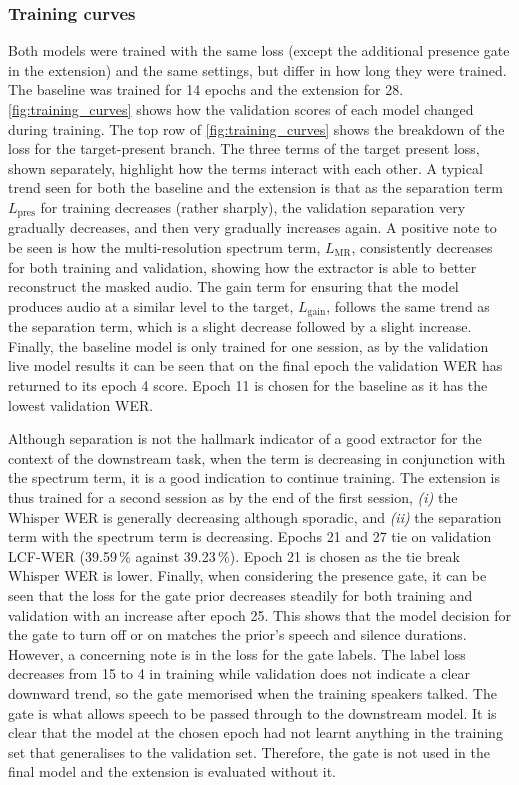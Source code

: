   \subsubsection{Training curves}
  \label{exp:curves}
  Both models were trained with the same loss (except the additional presence gate in the extension) and the same settings, but differ in how long they were trained. The baseline was trained for 14 epochs and the extension for 28. \autoref{fig:training_curves} shows how the validation scores of each model changed during training. The top row of \autoref{fig:training_curves} shows the breakdown of the loss for the target-present branch. The three terms of the target present loss, shown separately, highlight how the terms interact with each other. A typical trend seen for both the baseline and the extension is that as the separation term $L_{\text{pres}}$ for training decreases (rather sharply), the validation separation very gradually decreases, and then very gradually increases again. A positive note to be seen is how the multi-resolution spectrum term, $L_{\text{MR}}$, consistently decreases for both training and validation, showing how the extractor is able to better reconstruct the masked audio. The gain term for ensuring that the model produces audio at a similar level to the target, $L_{\text{gain}}$, follows the same trend as the separation term, which is a slight decrease followed by a slight increase. Finally, the baseline model is only trained for one session, as by the validation live model results it can be seen that on the final epoch the validation WER has returned to its epoch 4 score. Epoch 11 is chosen for the baseline as it has the lowest validation WER. 
    
  Although separation is not the hallmark indicator of a good extractor for the context of the downstream task, when the term is decreasing in conjunction with the spectrum term, it is a good indication to continue training. The extension is thus trained for a second session as by the end of the first session, \textit{(i)} the Whisper WER is generally decreasing although sporadic, and \textit{(ii)} the separation term with the spectrum term is decreasing. Epochs 21 and 27 tie on validation LCF-WER (39.59\,\% against 39.23\,\%). Epoch 21 is chosen as the tie break Whisper WER is lower. Finally, when considering the presence gate, it can be seen that the loss for the gate prior decreases steadily for both training and validation with an increase after epoch 25. This shows that the model decision for the gate to turn off or on matches the prior's speech and silence durations. However, a concerning note is in the loss for the gate labels. The label loss decreases from 15 to 4 in training while validation does not indicate a clear downward trend, so the gate memorised when the training speakers talked. The gate is what allows speech to be passed through to the downstream model. It is clear that the model at the chosen epoch had not learnt anything in the training set that generalises to the validation set. Therefore, the gate is not used in the final model and the extension is evaluated without it.

